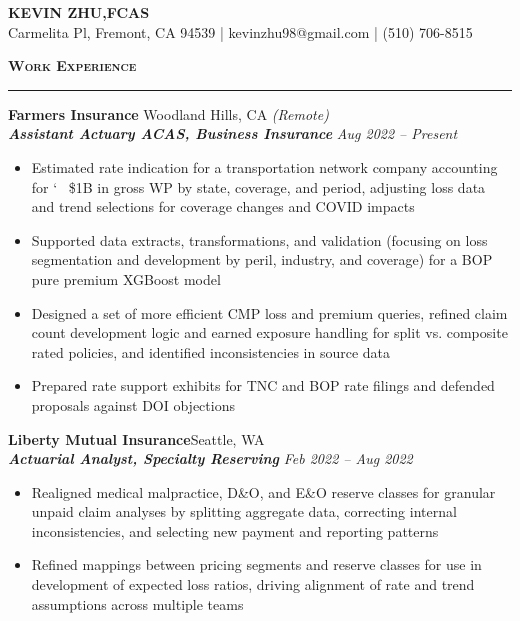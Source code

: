 \documentclass[11pt,letterpaper]{article}
\newcommand{\sectline}{\vspace{5pt}\hrule height 1.5pt\vspace{5pt}}
\newcommand{\sectspace}{\vspace{9pt}}
\newcommand{\smallspace}{\vspace{6pt}}
\newcommand{\heading}[1]{{\fontsize{12pt}{13pt} {\textbf{\textsc{#1}}}}}
\begin{document}
\centering
{\fontsize{13pt}{13pt}\selectfont \textbf{KEVIN ZHU,\hspace{1.7 mm}FCAS}} \vspace{2pt} \\

{\fontsize{11pt}{13pt} Carmelita Pl, Fremont, CA 94539 | kevinzhu98@gmail.com | (510) 706-8515}
\sectspace

\fontsize{11pt}{13.75pt}\selectfont
\raggedright

\heading{Work Experience}\sectline
\textbf{Farmers Insurance} \hfill Woodland Hills, CA \textit{(Remote)}\\
\textbf{\textit{Assistant Actuary ACAS, Business Insurance}} \hfill \textit{Aug 2022 -- Present}
\begin{itemize}
	\item Estimated rate indication for a transportation network company accounting for \char`~ \$1B in gross WP by state, coverage, and period, adjusting loss data and trend selections for coverage changes and COVID impacts
	\item Supported data extracts, transformations, and validation (focusing on loss segmentation and development by peril, industry, and coverage) for a BOP pure premium XGBoost model
	\item Designed a set of more efficient CMP loss and premium queries, refined claim count development logic and earned exposure handling for split vs. composite rated policies, and identified inconsistencies in source data
	\item Prepared rate support exhibits for TNC and BOP rate filings and defended proposals against DOI objections
\end{itemize}
\smallspace
\textbf{Liberty Mutual Insurance}\hfill Seattle, WA \\
\textbf{\textit{Actuarial Analyst, Specialty Reserving}} \hfill \textit{Feb 2022 -- Aug 2022} \\
\begin{itemize}
	\item Realigned medical malpractice, D\&O, and E\&O reserve classes for granular unpaid claim analyses by splitting aggregate data, correcting internal inconsistencies, and selecting new payment and reporting patterns
	\item Refined mappings between pricing segments and reserve classes for use in development of expected loss ratios, driving alignment of rate and trend assumptions across multiple teams
	
\end{itemize}
\end{document}
